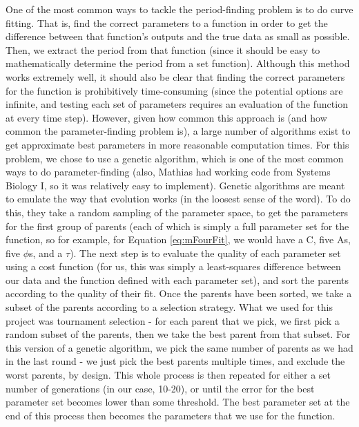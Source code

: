 \documentclass[conference]{IEEEtran}
\begin{document}
One of the most common ways to tackle the period-finding problem is to do curve fitting. That is, find the correct parameters to a function in order to get the difference between that function’s outputs and the true data as small as possible. Then, we extract the period from that function (since it should be easy to mathematically determine the period from a set function). Although this method works extremely well, it should also be clear that finding the correct parameters for the function is prohibitively time-consuming (since the potential options are infinite, and testing each set of parameters requires an evaluation of the function at every time step). However, given how common this approach is (and how common the parameter-finding problem is), a large number of algorithms exist to get approximate best parameters in more reasonable computation times.
For this problem, we chose to use a genetic algorithm, which is one of the most common ways to do parameter-finding (also, Mathias had working code from Systems Biology I, so it was relatively easy to implement). Genetic algorithms are meant to emulate the way that evolution works (in the loosest sense of the word). To do this, they take a random sampling of the parameter space, to get the parameters for the first group of parents (each of which is simply a full parameter set for the function, so for example, for Equation \ref{eq:mFourFit}, we would have a C, five As, five {$\phi$}s, and a $\tau$). The next step is to evaluate the quality of each parameter set using a cost function (for us, this was simply a least-squares difference between our data and the function defined with each parameter set), and sort the parents according to the quality of their fit. Once the parents have been sorted, we take a subset of the parents according to a selection strategy. What we used for this project was tournament selection - for each parent that we pick, we first pick a random subset of the parents, then we take the best parent from that subset. For this version of a genetic algorithm, we pick the same number of parents as we had in the last round - we just pick the best parents multiple times, and exclude the worst parents, by design. This whole process is then repeated for either a set number of generations (in our case, 10-20), or until the error for the best parameter set becomes lower than some threshold. The best parameter set at the end of this process then becomes the parameters that we use for the function.
\end{document}
